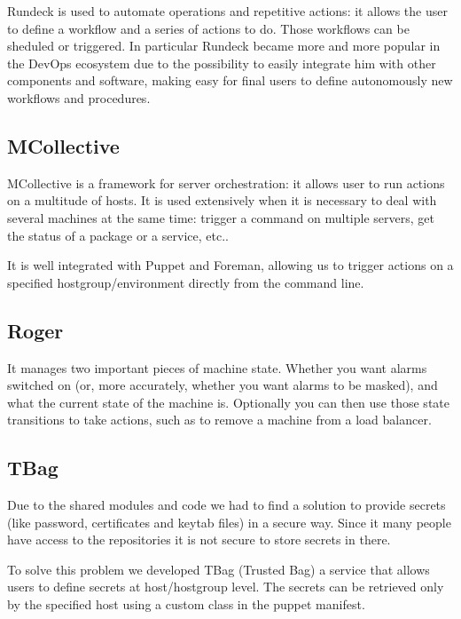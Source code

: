 Rundeck is used to automate operations and repetitive actions: it allows
the user to define a workflow and a series of actions to do. Those
workflows can be sheduled or triggered. In particular Rundeck became more
and more popular in the DevOps ecosystem due to the possibility to easily
integrate him with other components and software, making easy for final
users to define autonomously new workflows and procedures.

\subsection{MCollective}

MCollective is a framework for server orchestration: it allows user to run
actions on a multitude of hosts. It is used extensively when it is
necessary to deal with several machines at the same time: trigger
a command on multiple servers, get the status of a package or a service,
etc..

It is well integrated with Puppet and Foreman, allowing us to trigger
actions on a specified hostgroup/environment directly from the command
line.

\subsection{Roger}

It manages two important pieces of machine state. Whether you want alarms
switched on (or, more accurately, whether you want alarms to be masked),
and what the current state of the machine is. Optionally you can then use
those state transitions to take actions, such as to remove a machine
from a load balancer.

\subsection{TBag}

Due to the shared modules and code we had to find a solution to provide
secrets (like password, certificates and keytab files) in a secure way.
Since it many people have access to the repositories it is not secure to
store secrets in there.

To solve this problem we developed TBag (Trusted Bag) a service that
allows users to define secrets at host/hostgroup level. The secrets can be
retrieved only by the specified host using a custom class in the puppet
manifest.

